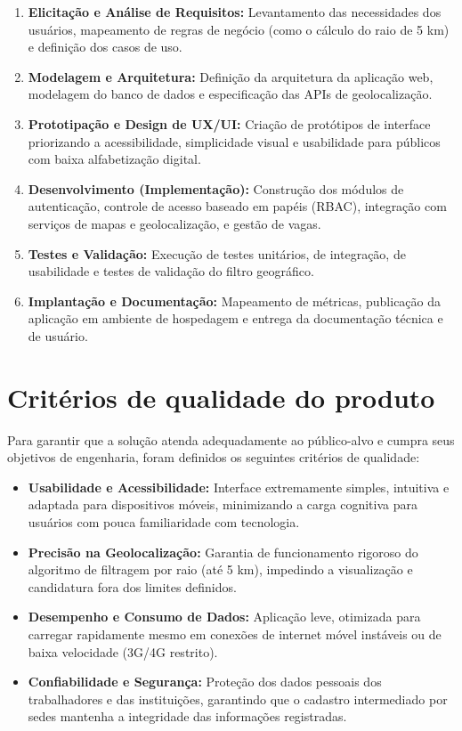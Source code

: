 \documentclass[
    12pt,
    oneside,
    a4paper,
    brazil
]{abntex2}
\begin{document}
\begin{enumerate}
    \item \textbf{Elicitação e Análise de Requisitos:} Levantamento das necessidades dos usuários, mapeamento de regras de negócio (como o cálculo do raio de 5 km) e definição dos casos de uso.
    \item \textbf{Modelagem e Arquitetura:} Definição da arquitetura da aplicação web, modelagem do banco de dados e especificação das APIs de geolocalização.
    \item \textbf{Prototipação e Design de UX/UI:} Criação de protótipos de interface priorizando a acessibilidade, simplicidade visual e usabilidade para públicos com baixa alfabetização digital.
    \item \textbf{Desenvolvimento (Implementação):} Construção dos módulos de autenticação, controle de acesso baseado em papéis (RBAC), integração com serviços de mapas e geolocalização, e gestão de vagas.
    \item \textbf{Testes e Validação:} Execução de testes unitários, de integração, de usabilidade e testes de validação do filtro geográfico.
    \item \textbf{Implantação e Documentação:} Mapeamento de métricas, publicação da aplicação em ambiente de hospedagem e entrega da documentação técnica e de usuário.
\end{enumerate}

\section{Critérios de qualidade do produto}
Para garantir que a solução atenda adequadamente ao público-alvo e cumpra seus objetivos de engenharia, foram definidos os seguintes critérios de qualidade:

\begin{itemize}
    \item \textbf{Usabilidade e Acessibilidade:} Interface extremamente simples, intuitiva e adaptada para dispositivos móveis, minimizando a carga cognitiva para usuários com pouca familiaridade com tecnologia.
    \item \textbf{Precisão na Geolocalização:} Garantia de funcionamento rigoroso do algoritmo de filtragem por raio (até 5 km), impedindo a visualização e candidatura fora dos limites definidos.
    \item \textbf{Desempenho e Consumo de Dados:} Aplicação leve, otimizada para carregar rapidamente mesmo em conexões de internet móvel instáveis ou de baixa velocidade (3G/4G restrito).
    \item \textbf{Confiabilidade e Segurança:} Proteção dos dados pessoais dos trabalhadores e das instituições, garantindo que o cadastro intermediado por sedes mantenha a integridade das informações registradas.
\end{itemize}
\end{document}
